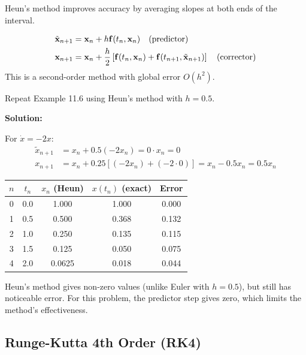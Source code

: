 Heun's method improves accuracy by averaging slopes at both ends of the interval.

\begin{definitionbox}[title=Definition 11.11: Heun's Method (Improved Euler)]
\begin{align}
\tilde{\mathbf{x}}_{n+1} &= \mathbf{x}_n + h\mathbf{f}(t_n, \mathbf{x}_n) \quad \text{(predictor)} \\
\mathbf{x}_{n+1} &= \mathbf{x}_n + \frac{h}{2}\left[\mathbf{f}(t_n, \mathbf{x}_n) + \mathbf{f}(t_{n+1}, \tilde{\mathbf{x}}_{n+1})\right] \quad \text{(corrector)}
\end{align}
This is a second-order method with global error $O(h^2)$.
\end{definitionbox}

\begin{examplebox}[title=Example 11.7: Heun's Method Comparison]
Repeat Example 11.6 using Heun's method with $h = 0.5$.

\textbf{Solution:}

For $\dot{x} = -2x$:
\begin{align}
\tilde{x}_{n+1} &= x_n + 0.5(-2x_n) = 0 \cdot x_n = 0 \\
x_{n+1} &= x_n + 0.25[(-2x_n) + (-2 \cdot 0)] = x_n - 0.5x_n = 0.5x_n
\end{align}

\begin{center}
\begin{tabular}{ccccc}
\toprule
$n$ & $t_n$ & $x_n$ (Heun) & $x(t_n)$ (exact) & Error \\
\midrule
0 & 0.0 & 1.000 & 1.000 & 0.000 \\
1 & 0.5 & 0.500 & 0.368 & 0.132 \\
2 & 1.0 & 0.250 & 0.135 & 0.115 \\
3 & 1.5 & 0.125 & 0.050 & 0.075 \\
4 & 2.0 & 0.0625 & 0.018 & 0.044 \\
\bottomrule
\end{tabular}
\end{center}

Heun's method gives non-zero values (unlike Euler with $h=0.5$), but still has noticeable error. For this problem, the predictor step gives zero, which limits the method's effectiveness.
\end{examplebox}

\subsection{Runge-Kutta 4th Order (RK4)}

